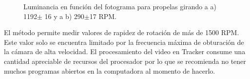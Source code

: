 \begin{figure}[H]
\centering
    \caption[Luminancia en función del fotograma para determinar rapidez de giro de propela.]{Luminancia en función del fotograma para propelas girando a a) 1192$\pm$ 16 y a b) 290$\pm$17 RPM.}
    \label{fig:tracker}
\end{figure} 

El método permite medir valores de rapidez de rotación de más de 1500 RPM. Este valor solo se encuentra limitado por la frecuencia máxima de obturación de la cámara de alta velocidad. El procesamiento del video en Tracker consume una cantidad apreciable de recursos del procesador por lo que se recomienda no tener muchos programas abiertos en la computadora al momento de hacerlo.

